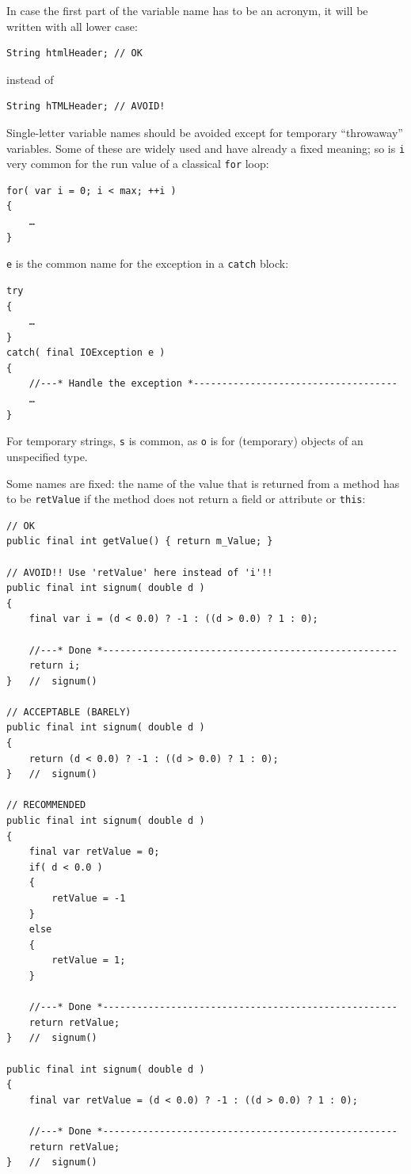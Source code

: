 \documentclass[11pt,a4paper, titlepage, parskip=half, headsepline, footsepline, cleardoublepage=current, headheight=1cm]{scrbook}
\begin{document}
In case the first part of the variable name has to be an acronym, it will be written with all lower case:
\begin{lstlisting}
String htmlHeader; // OK
\end{lstlisting}
instead of
\begin{lstlisting}
String hTMLHeader; // AVOID!
\end{lstlisting}

Single-letter variable names should be avoided except for temporary “throwaway” variables. Some of these are widely used and have already a fixed meaning; so is \lstinline|i| very common for the run value of a classical \lstinline|for| loop:
\begin{lstlisting}
for( var i = 0; i < max; ++i )
{
    …
}
\end{lstlisting}

\lstinline|e| is the common name for the exception in a \lstinline|catch| block:
\begin{lstlisting}
try
{
    …
}
catch( final IOException e )
{
    //---* Handle the exception *------------------------------------
    …
}    
\end{lstlisting}

For temporary strings, \lstinline|s| is common, as \lstinline|o| is for (temporary) objects of an unspecified type.

Some names are fixed: the name of the value that is returned from a method has to be \lstinline|retValue| if the method does not return a field or attribute or \lstinline|this|:
\begin{lstlisting}
// OK
public final int getValue() { return m_Value; }

// AVOID!! Use 'retValue' here instead of 'i'!!
public final int signum( double d )
{
    final var i = (d < 0.0) ? -1 : ((d > 0.0) ? 1 : 0);
    
    //---* Done *----------------------------------------------------
    return i;
}   //  signum()

// ACCEPTABLE (BARELY)
public final int signum( double d )
{
    return (d < 0.0) ? -1 : ((d > 0.0) ? 1 : 0);
}   //  signum()

// RECOMMENDED
public final int signum( double d )
{
    final var retValue = 0;
    if( d < 0.0 )
    {
        retValue = -1
    }
    else
    {
        retValue = 1;
    }

    //---* Done *----------------------------------------------------
    return retValue;
}   //  signum()

public final int signum( double d )
{
    final var retValue = (d < 0.0) ? -1 : ((d > 0.0) ? 1 : 0);

    //---* Done *----------------------------------------------------
    return retValue;
}   //  signum()
\end{lstlisting}
\end{document}

